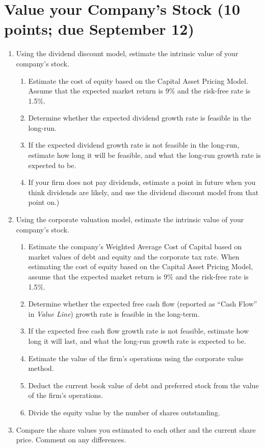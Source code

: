 \section{Value your Company's Stock (10 points; due September 12)}
\begin{enumerate}
\item Using the dividend discount model, estimate the intrinsic value of your company's stock.
\begin{enumerate}
\item Estimate the cost of equity based on the Capital Asset Pricing Model. Assume that the expected market return is 9\% and the risk-free rate is 1.5\%.
\item Determine whether the expected dividend growth rate is feasible in the long-run. 
\item If the expected dividend growth rate is not feasible in the long-run, estimate how long it will be feasible, and what the long-run growth rate is expected to be.
\item If your firm does not pay dividends, estimate a point in future when you think dividends are likely, and use the dividend discount model from that point on.)
\end{enumerate}
\item Using the corporate valuation model, estimate the intrinsic value of your company's stock.
\begin{enumerate}
\item Estimate the company's Weighted Average Cost of Capital based on market values of debt and equity and the corporate tax rate. When estimating the cost of equity based on the Capital Asset Pricing Model, assume that the expected market return is 9\% and the risk-free rate is 1.5\%.
\item Determine whether the expected free cash flow (reported as ``Cash Flow'' in \textit{Value Line}) growth rate is feasible in the long-term.
\item If the expected free cash flow growth rate is not feasible, estimate how long it will last, and what the long-run growth rate is expected to be.
\item Estimate the value of the firm's operations using the corporate value method.
\item Deduct the current book value of debt and preferred stock from the value of the firm's operations.
\item Divide the equity value by the number of shares outstanding.
\end{enumerate}
\item Compare the share values you estimated to each other and the current share price. Comment on any differences.
\end{enumerate}
